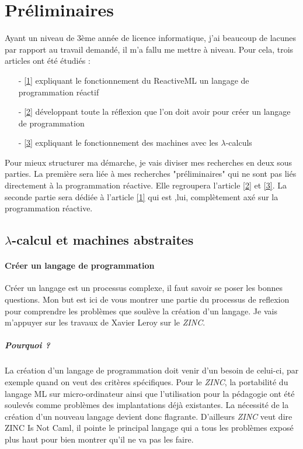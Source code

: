 \documentclass[10pt,a4paper]{article}
\begin{document}
	\section{Préliminaires}
	 
	 	Ayant un niveau de 3ème année de licence informatique, j'ai beaucoup de lacunes par rapport au travail demandé, il m'a fallu me mettre à niveau. Pour cela, trois articles ont été étudiés : 
	 	\begin{enumerate}
	 		\item[-] \hyperref[ReactiveML]{[1]} expliquant le fonctionnement du ReactiveML un langage de programmation réactif
	 		\item[-] \hyperref[ZINC]{[2]} développant toute la réflexion que l'on doit avoir pour créer un langage de programmation
		 	\item[-] \hyperref[Calculi]{[3]} expliquant le fonctionnement des machines avec les $\lambda$-calculs
		 \end{enumerate}
 		 Pour mieux structurer ma démarche, je vais diviser mes recherches en deux sous parties. La première sera liée à mes recherches "préliminaires" qui ne sont pas liés directement à la programmation réactive. Elle regroupera l'article \hyperref[ZINC]{[2]} et \hyperref[Calculi]{[3]}. La seconde partie sera dédiée à l'article \hyperref[ReactiveML]{[1]} qui est ,lui, complètement axé sur la programmation réactive. 
	 
		\subsection{$\lambda$-calcul et machines abstraites}
			
			\paragraph{Créer un langage de programmation}
			Créer un langage est un processus complexe, il faut savoir se poser les bonnes questions. Mon but est ici de vous montrer une partie du processus de reflexion pour comprendre les problèmes que soulève la création d'un langage. Je vais m'appuyer sur les travaux de Xavier Leroy sur le \textit{ZINC}.
			\medbreak
			
				\subparagraph{Pourquoi ?} 
				La création d'un langage de programmation doit venir d'un besoin de celui-ci, par exemple quand on veut des critères spécifiques. Pour le \textit{ZINC}, la portabilité du langage ML sur micro-ordinateur ainsi que l'utilisation pour la pédagogie ont été soulevés comme problèmes des implantations déjà existantes. La nécessité de la création d'un nouveau langage devient donc flagrante. D'ailleurs \textit{ZINC} veut dire ZINC Is Not Caml, il pointe le principal langage qui a tous les problèmes exposé plus haut pour bien montrer qu'il ne va pas les faire. 
				
\end{document}
